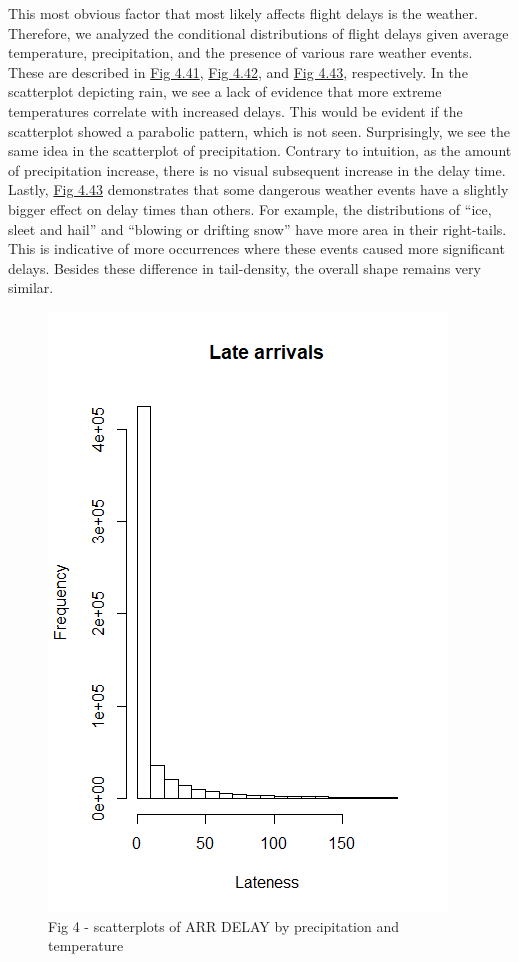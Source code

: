 \documentclass[12pt, a4paper, openany]{book}
\newcommand\tab[1][1cm]{\hspace*{#1}}
\begin{document}
			\tab This most obvious factor that most likely affects flight delays is the weather. Therefore, we analyzed the conditional distributions of flight delays given average temperature, precipitation, and the presence of various rare weather events. These are described in \underline{Fig 4.41}, \underline{Fig 4.42}, and \underline{Fig 4.43}, respectively. In the scatterplot depicting rain, we see a lack of evidence that more extreme temperatures correlate with increased delays. This would be evident if the scatterplot showed a parabolic pattern, which is not seen. Surprisingly, we see the same idea in the scatterplot of precipitation. Contrary to intuition, as the amount of precipitation increase, there is no visual subsequent increase in the delay time. Lastly, \underline{Fig 4.43} demonstrates that some dangerous weather events have a slightly bigger effect on delay times than others. For example, the distributions of “ice, sleet and hail” and “blowing or drifting snow” have more area in their right-tails. This is indicative of more occurrences where these events caused more significant delays. Besides these difference in tail-density, the overall shape remains very similar. \\
			\begin{figure}[h]
	 		\includegraphics[width = .75 \textwidth]{../figures/LateArrivalsHistogram}
	 		\caption{Fig 4 - scatterplots of ARR DELAY by precipitation and temperature}
	 		\end{figure}
\end{document}
